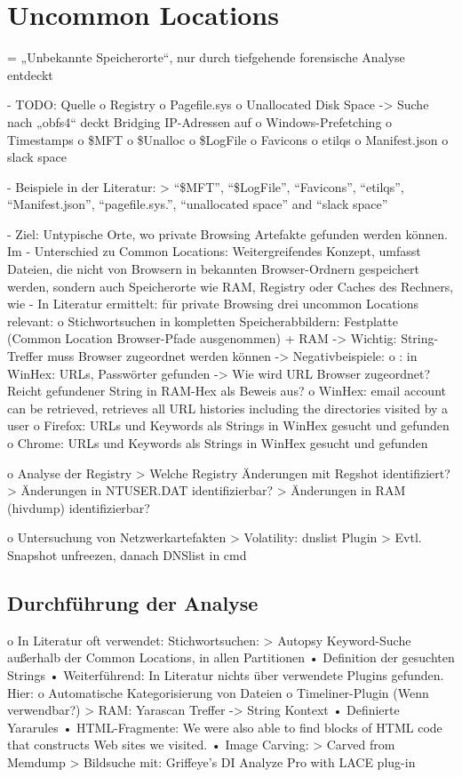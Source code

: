 \section{Uncommon Locations}

= „Unbekannte Speicherorte“, nur durch tiefgehende forensische Analyse entdeckt

- TODO: Quelle
o	Registry
o	Pagefile.sys
o	Unallocated Disk Space
	->	Suche nach „obfs4“ deckt Bridging IP-Adressen auf
o	Windows-Prefetching
o	Timestamps
o	\$MFT
o	\$Unalloc
o	\$LogFile
o	Favicons
o	etilqs
o	Manifest.json
o	slack space

- Beispiele in der Literatur:
	> “\$MFT”, “\$LogFile”, “Favicons”, “etilqs”, “Manifest.json”, “pagefile.sys.”, “unallocated space” and “slack space” \cite{Montasari.2015}


-	Ziel: Untypische Orte, wo private Browsing Artefakte gefunden werden können. Im
-	Unterschied zu Common Locations: Weitergreifendes Konzept, umfasst Dateien, die nicht von Browsern in bekannten Browser-Ordnern gespeichert werden, sondern auch Speicherorte wie RAM, Registry oder Caches des Rechners, wie 
-	In Literatur ermittelt: für private Browsing drei uncommon Locations relevant:
	o	Stichwortsuchen in kompletten Speicherabbildern: Festplatte (Common Location Browser-Pfade ausgenommen) + RAM 
		-> Wichtig: String-Treffer muss Browser zugeordnet werden können
		-> Negativbeispiele:
			o \cite{Rochmadi.2017}: in WinHex: URLs, Passwörter gefunden -> Wie wird URL Browser zugeordnet? Reicht gefundener String in RAM-Hex als Beweis aus?
			o \cite{Md.2018} WinHex: email account can be retrieved, retrieves all URL histories including the directories visited by a user
			o \cite{Montasari.2015}	Firefox: URLs und Keywords als Strings in WinHex gesucht und gefunden 
			o \cite{Montasari.2015}	Chrome: URLs und Keywords als Strings in WinHex gesucht und gefunden
			
	o	Analyse der Registry
		>	Welche Registry Änderungen mit Regshot identifiziert?
		>	Änderungen in NTUSER.DAT identifizierbar?
		>	Änderungen in RAM (hivdump) identifizierbar?
	
	o	Untersuchung von Netzwerkartefakten
		>	Volatility: dnslist Plugin
		>	Evtl. Snapshot unfreezen, danach DNSlist in cmd
		


\subsection*{Durchführung der Analyse}
o	In Literatur oft verwendet: Stichwortsuchen:
>	Autopsy Keyword-Suche außerhalb der Common Locations, in allen Partitionen
	•	Definition der gesuchten Strings
	•	Weiterführend:  In Literatur nichts über verwendete Plugins gefunden. Hier:
		o	Automatische Kategorisierung von Dateien
		o	Timeliner-Plugin (Wenn verwendbar?)
>	RAM: Yarascan Treffer -> String Kontext
	•	Definierte Yararules
	•	HTML-Fragmente: \cite{Said.2011} We were also able to find blocks of HTML code that constructs Web sites we visited.
	•	Image Carving: 
		> Carved from Memdump \cite{Ohana.2013}
		>  Bildsuche mit: Griffeye’s DI Analyze Pro with LACE plug-in \cite{Horsman.2019}
	
